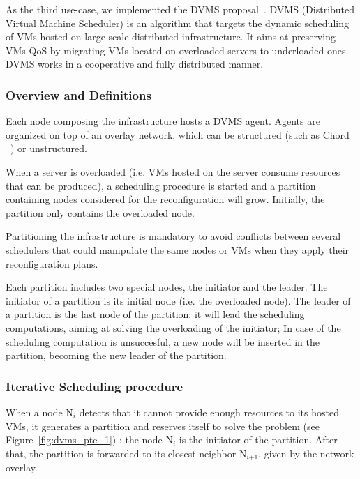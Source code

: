 As the third use-case, we implemented the DVMS
proposal~\cite{quesnel:cpe2012}.
DVMS (Distributed Virtual Machine
Scheduler) is an algorithm that targets the dynamic scheduling of VMs hosted on
large-scale distributed infrastructure. It aims at preserving VMs QoS by
migrating VMs located on overloaded servers to underloaded ones. DVMS works in
a cooperative and fully distributed manner.

\subsubsection{Overview and Definitions}

Each node composing the infrastructure hosts a DVMS agent. Agents
are organized on top of an overlay network, which can be structured (such as
Chord ~\cite{stoica:2001:sigcomm01}) or unstructured.

When a server is overloaded (i.e. VMs hosted on the server consume resources
that can be produced), a scheduling procedure is started and a partition
containing nodes considered for the reconfiguration will grow. Initially, the
partition only contains the overloaded node.

Partitioning the infrastructure is mandatory to avoid conflicts between several
schedulers that could manipulate the same nodes or VMs when they apply their
reconfiguration plans.

Each partition includes two special nodes, the initiator and the leader.
The initiator of a partition is its initial node (i.e. the overloaded node).
The leader of a partition is the last node of the partition: it will lead the
scheduling computations, aiming at solving the overloading of the initiator;
In case of the scheduling computation is unsuccesful, a new node will be
inserted in the partition, becoming the new leader of the partition.


\subsubsection{Iterative Scheduling procedure}

When a node N\(_{\textit{i}}\) detects that it cannot provide enough resources
to its hosted VMs, it generates a partition and reserves itself to solve the
problem (see Figure~\ref{fig:dvms_pte_1}) : the node N\(_{\textit{i}}\) is the
initiator of the partition. After that, the partition is forwarded to its
closest neighbor N\(_{\textit{i+1}}\), given by the network overlay.

